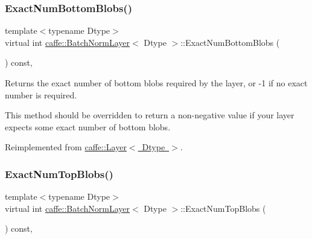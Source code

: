 \subsubsection{\texorpdfstring{Exact\+Num\+Bottom\+Blobs()}{ExactNumBottomBlobs()}\hspace{0.1cm}{\footnotesize\ttfamily [2/2]}}
{\footnotesize\ttfamily template$<$typename Dtype$>$ \\
virtual int \mbox{\hyperlink{classcaffe_1_1_batch_norm_layer}{caffe\+::\+Batch\+Norm\+Layer}}$<$ Dtype $>$\+::Exact\+Num\+Bottom\+Blobs (\begin{DoxyParamCaption}{ }\end{DoxyParamCaption}) const\hspace{0.3cm}{\ttfamily [inline]}, {\ttfamily [virtual]}}



Returns the exact number of bottom blobs required by the layer, or -\/1 if no exact number is required. 

This method should be overridden to return a non-\/negative value if your layer expects some exact number of bottom blobs. 

Reimplemented from \mbox{\hyperlink{classcaffe_1_1_layer_a8e5ee0494d85f5f55fc4396537cbc60f}{caffe\+::\+Layer$<$ Dtype $>$}}.

\mbox{\label{classcaffe_1_1_batch_norm_layer_ab8575decdd0c5c42e24b9c3424f708ad}} 
\subsubsection{\texorpdfstring{Exact\+Num\+Top\+Blobs()}{ExactNumTopBlobs()}\hspace{0.1cm}{\footnotesize\ttfamily [1/2]}}
{\footnotesize\ttfamily template$<$typename Dtype$>$ \\
virtual int \mbox{\hyperlink{classcaffe_1_1_batch_norm_layer}{caffe\+::\+Batch\+Norm\+Layer}}$<$ Dtype $>$\+::Exact\+Num\+Top\+Blobs (\begin{DoxyParamCaption}{ }\end{DoxyParamCaption}) const\hspace{0.3cm}{\ttfamily [inline]}, {\ttfamily [virtual]}}



